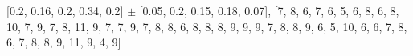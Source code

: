 
[0.2, 0.16, 0.2, 0.34, 0.2] $\pm$ [0.05, 0.2, 0.15, 0.18, 0.07], [7, 8, 6, 7, 6, 5, 6, 8, 6, 8, 10, 7, 9, 7, 8, 11, 9, 7, 7, 9, 7, 8, 8, 6, 8, 8, 8, 9, 9, 9, 7, 8, 8, 9, 6, 5, 10, 6, 6, 7, 8, 6, 7, 8, 8, 9, 11, 9, 4, 9]\\
    